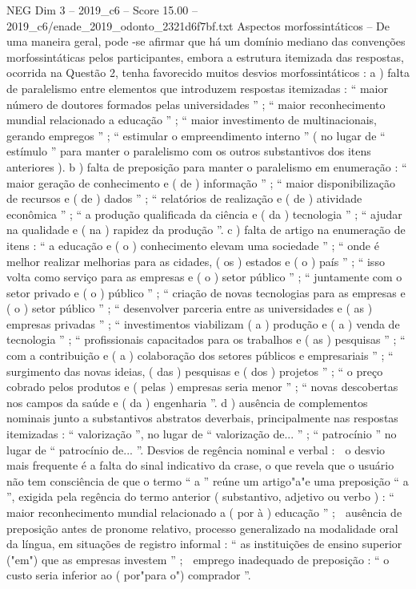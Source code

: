 \begin{textsample}{NEG Dim 3 – 2019\_c6 – Score 15.00 – 2019\_c6/enade\_2019\_odonto\_2321d6f7bf.txt}
Aspectos morfossintáticos – De uma maneira geral, pode -se afirmar que há um domínio mediano das convenções morfossintáticas pelos participantes, embora a estrutura itemizada das respostas, ocorrida na Questão 2, tenha favorecido muitos desvios morfossintáticos : a ) falta de paralelismo entre elementos que introduzem respostas itemizadas : “ maior número de doutores formados pelas universidades ” ; “ maior reconhecimento mundial relacionado a educação ” ; “ maior investimento de multinacionais, gerando empregos ” ; “ estimular o empreendimento interno ” ( no lugar de “ estímulo ” para manter o paralelismo com os outros substantivos dos itens anteriores ). b ) falta de preposição para manter o paralelismo em enumeração : “ maior geração de conhecimento e ( de ) informação ” ; “ maior disponibilização de recursos e ( de ) dados ” ; “ relatórios de realização e ( de ) atividade econômica ” ; “ a produção qualificada da ciência e ( da ) tecnologia ” ; “ ajudar na qualidade e ( na ) rapidez da produção ”. c ) falta de artigo na enumeração de itens : “ a educação e ( o ) conhecimento elevam uma sociedade ” ; “ onde é melhor realizar melhorias para as cidades, ( os ) estados e ( o ) país ” ; “ isso volta como serviço para as empresas e ( o ) setor público ” ; “ juntamente com o setor privado e ( o ) público ” ; “ criação de novas tecnologias para as empresas e ( o ) setor público ” ; “ desenvolver parceria entre as universidades e ( as ) empresas privadas ” ; “ investimentos viabilizam ( a ) produção e ( a ) venda de tecnologia ” ; “ profissionais capacitados para os trabalhos e ( as ) pesquisas ” ; “ com a contribuição e ( a ) colaboração dos setores públicos e empresariais ” ; “ surgimento das novas ideias, ( das ) pesquisas e ( dos ) projetos ” ; “ o preço cobrado pelos produtos e ( pelas ) empresas seria menor ” ; “ novas descobertas nos campos da saúde e ( da ) engenharia ”. d ) ausência de complementos nominais junto a substantivos abstratos deverbais, principalmente nas respostas itemizadas : “ valorização ”, no lugar de “ valorização de... ” ; “ patrocínio ” no lugar de “ patrocínio de... ”.
Desvios de regência nominal e verbal :  o desvio mais frequente é a falta do sinal indicativo da crase, o que revela que o usuário não tem consciência de que o termo “ a ” reúne um artigo"a"e uma preposição “ a ”, exigida pela regência do termo anterior ( substantivo, adjetivo ou verbo ) : “ maior reconhecimento mundial relacionado a ( por à ) educação ” ;  ausência de preposição antes de pronome relativo, processo generalizado na modalidade oral da língua, em situações de registro informal : “ as instituições de ensino superior ("em") que as empresas investem ” ;  emprego inadequado de preposição : “ o custo seria inferior ao ( por"para o") comprador ”.

\end{textsample}
